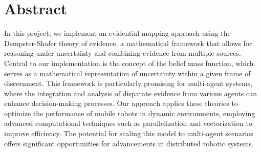 \chapter*{Abstract}

In this project, we implement an evidential mapping approach using the Dempster-Shafer theory of evidence, a mathematical framework that allows for reasoning under uncertainty and combining evidence from multiple sources. Central to our implementation is the concept of the belief mass function, which serves as a mathematical representation of uncertainty within a given frame of discernment. This framework is particularly promising for multi-agent systems, where the integration and analysis of disparate evidence from various agents can enhance decision-making processes. Our approach applies these theories to optimize the performance of mobile robots in dynamic environments, employing advanced computational techniques such as parallelization and vectorization to improve efficiency. The potential for scaling this model to multi-agent scenarios offers significant opportunities for advancements in distributed robotic systems.

